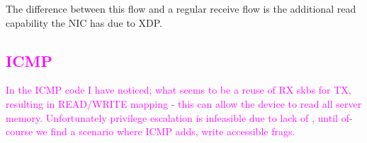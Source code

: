 The difference between this flow and a regular receive flow is the additional read capability the NIC has due to XDP.
\textcolor{magenta}{\subsection{ICMP}
In the ICMP code I have noticed; what seems to be a reuse of RX skbs for TX, resulting in READ/WRITE mapping - this can allow the device to read all server memory. Unfortunately privilege escalation is infeasible due to lack of \means, until of-course we find a scenario where ICMP adds, write accessible frags.} 

